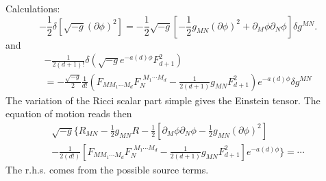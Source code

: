 Calculations:
\[
	-\frac{1}{2}\delta \left[ \sqrt{-g} (\partial \phi)^2\right] 
	=-\frac{1}{2} \sqrt{-g}\left[ -\frac{1}{2} g_{MN}(\partial\phi)^2
	+\partial_M\phi \partial_N\phi\right] \delta g^{MN}
.\] 
and
\begin{align*}
	- \frac{1}{2(d+1)!} \delta \left( \sqrt{-g} e^{-a(d) \phi} F_{d+1}^2 \right)  \\
	= - \frac{\sqrt{-g}}{2} \frac{1}{d!}
	\left( F_{M M_1\cdots M_d} F_{N}^{~~M_1\cdots M_d} 
	-\frac{1}{2(d+1)} g_{MN} F_{d+1}^2\right) 
	e^{-a(d)\phi} \delta g^{MN}
\end{align*}
The variation of the Ricci scalar part
simple gives the Einstein tensor.
The equation of motion reads then
\begin{align*}
	\sqrt{-g} \Bigg\{ R_{MN} - \frac{1}{2} g_{MN}R
	-\frac{1}{2} \left[ \partial_M\phi \partial_N\phi-\frac{1}{2} g_{MN}(\partial\phi)^2
	\right]  \\
- \frac{1}{2(d!)}\left[ F_{M M_1\cdots M_d} F_{N}^{~~M_1\cdots M_d} 
	-\frac{1}{2(d+1)} g_{MN} F_{d+1}^2\right] 
	e^{-a(d)\phi} 
\Bigg\} = \cdots
\end{align*}
The r.h.s. comes from the possible source terms.
